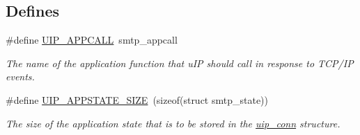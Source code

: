 \subsection*{Defines}
\begin{CompactItemize}
\item 
\hypertarget{a00078_g41aa744caa46913b3b3aedb2a4e78546}{
\#define \hyperlink{a00078_g41aa744caa46913b3b3aedb2a4e78546}{UIP\_\-APPCALL}~smtp\_\-appcall}
\label{a00078_g41aa744caa46913b3b3aedb2a4e78546}

\begin{CompactList}\small\item\em The name of the application function that u\-IP should call in response to TCP/IP events. \item\end{CompactList}\item 
\hypertarget{a00078_g04e916653107663a756635a739fcef1b}{
\#define \hyperlink{a00078_g04e916653107663a756635a739fcef1b}{UIP\_\-APPSTATE\_\-SIZE}~(sizeof(struct smtp\_\-state))}
\label{a00078_g04e916653107663a756635a739fcef1b}

\begin{CompactList}\small\item\em The size of the application state that is to be stored in the \hyperlink{a00028}{uip\_\-conn} structure. \item\end{CompactList}\end{CompactItemize}
